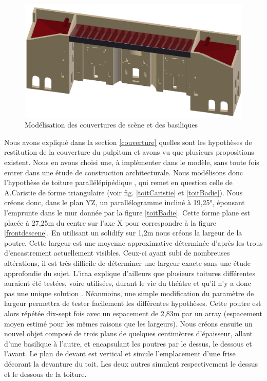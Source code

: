 \begin{figure}[!h]
	\includegraphics[width=\linewidth]{images/modCouvertures}
	\caption{Modélisation des couvertures de scène et des basiliques} 
	\label{modCouvertures} 
\end{figure} 
Nous avons expliqué dans la section \ref{couverture} quelles sont les hypothèses de restitution de la couverture du \gls{pulpitum} et avons vu que plusieurs propositions existent. Nous en avons choisi une, à implémenter dans le modèle, sans toute fois entrer dans une étude de construction architecturale. Nous modélisons donc l'hypothèse de toiture parallélépipédique \cite[Chap. I, sect. 6]{orangeTxt}, qui remet en question celle de A.Caristie de forme triangulaire (voir fig. \ref{toitCaristie} et \ref{toitBadie}). Nous créons donc, dans le plan YZ, un parallélogramme incliné à 19,25°, épousant l'emprunte dans le mur donnée par la figure \ref{toitBadie}. Cette forme plane est placée à 27,25m du centre sur l'axe X pour correspondre à la figure \ref{frontdescene}. En utilisant un \gls{solidify} sur 1,2m nous créons la largeur de la poutre. Cette largeur est une moyenne approximative déterminée d'après les trous d'encastrement actuellement visibles. Ceux-ci ayant subi de nombreuses altérations, il est très difficile de déterminer une largeur exacte sans une étude approfondie du sujet. L'\gls{iraa} explique d'ailleurs que plusieurs toitures différentes auraient été testées, voire utilisées, durant le vie du théâtre et qu'il n'y a donc pas une unique solution \cite[p. 34]{orangeTxt}. Néanmoins, une simple modification du paramètre de largeur permettra de tester facilement les différentes hypothèses. Cette poutre est alors répétée dix-sept fois avec un espacement de 2,83m par un \gls{array} (espacement moyen estimé pour les mêmes raisons que les largeurs). Nous créons ensuite un nouvel objet composé de trois plans de quelques centimètres d'épaisseur, allant d'une basilique à l'autre, et encapsulant les poutres par le dessus, le dessous et l'avant. Le plan de devant est vertical et simule l'emplacement d'une frise décorant la devanture du toit. Les deux autres simulent respectivement le dessus et le dessous de la toiture.

